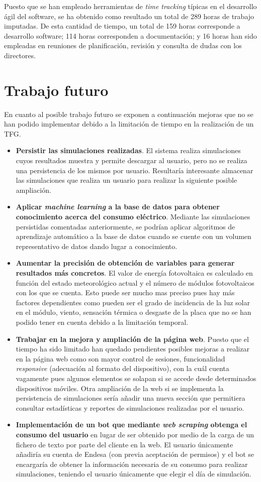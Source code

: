 Puesto que se han empleado herramientas de \textit{time tracking} típicas en el desarrollo ágil del software, se ha obtenido como resultado un total de 289 horas de trabajo imputadas. De esta cantidad de tiempo, un total de 159 horas corresponde a desarrollo software; 114 horas corresponden a documentación; y 16 horas han sido empleadas en reuniones de planificación, revisión y consulta de dudas con los directores.
\section{Trabajo futuro}
En cuanto al posible trabajo futuro se exponen a continuación mejoras que no se han podido implementar debido a la limitación de tiempo en la realización de un \gls{TFG}.
\begin{itemize}
\item \textbf{Persistir las simulaciones realizadas}. El sistema realiza simulaciones cuyos resultados muestra y permite descargar al usuario, pero no se realiza una persistencia de los mismos por usuario. Resultaría interesante almacenar las simulaciones que realiza un usuario para realizar la siguiente posible ampliación.
\item \textbf{Aplicar \textit{machine learning} a la base de datos para obtener conocimiento acerca del consumo eléctrico}. Mediante las simulaciones persistidas comentadas anteriormente, se podrían aplicar algoritmos de aprendizaje automático a la base de datos cuando se cuente con un volumen representativo de datos dando lugar a conocimiento.
\item \textbf{Aumentar la precisión de obtención de variables para generar resultados más concretos}. El valor de energía fotovoltaica es calculado en función del estado meteorológico actual y el número de módulos fotovoltaicos con los que se cuenta. Esto puede ser mucho mas preciso pues hay más factores dependientes como pueden ser el grado de incidencia de la luz solar en el módulo, viento, sensación térmica o desgaste de la placa que no se han podido tener en cuenta debido a la limitación temporal.
\item \textbf{Trabajar en la mejora y ampliación de la página web}. Puesto que el tiempo ha sido limitado han quedado pendientes posibles mejoras a realizar en la página web como son mayor control de sesiones, funcionalidad \textit{responsive} (adecuación al formato del dispositivo), con la cuál cuenta vagamente pues algunos elementos se solapan si se accede desde determinados dispositivos móviles. Otra ampliación de la web si se implementa la persistencia de simulaciones sería añadir una nueva sección que permitiera consultar estadísticas y reportes de simulaciones realizadas por el usuario.
\item \textbf{Implementación de un bot que mediante \textit{web scraping} obtenga el consumo del usuario} en lugar de ser obtenido por medio de la carga de un fichero de texto por parte del cliente en la web. El usuario únicamente añadiría su cuenta de Endesa (con previa aceptación de permisos) y el bot se encargaría de obtener la información necesaria de su consumo para realizar simulaciones, teniendo el usuario únicamente que elegir el día de simulación.
\end{itemize}
